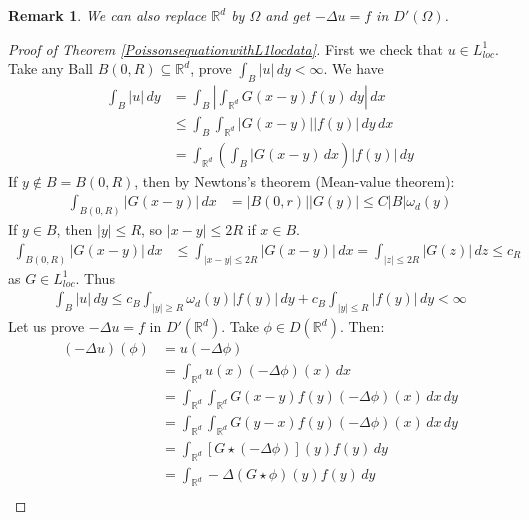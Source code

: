 \documentclass{report}
\theoremstyle{tommy}
\newtheorem{rem}[defn]{Remark}
\begin{document}
  \begin{rem}
    We can also replace \(\mathbb{R}^d\) by \(\Omega\) and get \(- \Delta u = f\) in \(D'(\Omega)\). 
  \end{rem}

  \begin{proof}[Proof of Theorem \ref{PoissonsequationwithL1locdata}]
    First we check that \(u \in L_{loc}^1\). Take any Ball \(B(0, R) \subseteq \mathbb{R}^d\), prove \(\int_B |u| \, dy < \infty\). We have 
    \begin{align*}
      \int_B |u| \, dy 
      &= \int_B \left| \int_{\mathbb{R}^d} G(x-y) f(y) \, dy \right| \, dx \\
      &\le \int_B \int_{\mathbb{R}^d} |G(x-y)||f(y)| \, dy \, dx \\
      &= \int_{\mathbb{R}^d} \left(\int_B |G(x-y) \, dx\right)|f(y)| \, dy
    \end{align*}
    If \(y \notin B = B(0,R)\), then by Newtons's theorem (Mean-value theorem):
    \begin{align*}
      \int_{B(0, R)} |G(x-y)| \, dx
      &= |B(0, r)| |G(y)|
      \le C|B| \omega_d(y)
    \end{align*}
    If \(y \in B\), then \(|y| \le R\), so \(|x-y| \le 2 R\) if \(x \in B\).
    \begin{align*}
      \int_{B(0,R)}|G(x-y)| \, dx
      &\le \int_{|x-y|\le 2 R} |G(x-y)| \, dx
      = \int_{|z| \le 2 R} |G(z)| \, dz 
      \le c_R
    \end{align*}
    as \(G \in L_{loc}^1\). Thus
    \begin{align*}
      \int_B |u| \, dy 
      \le c_B \int_{|y|\ge R} \omega_d (y) |f(y)|\, dy + c_B \int_{|y|\le R} |f(y)| \, dy < \infty
    \end{align*}
    Let us prove \(- \Delta u = f\) in \(D'(\mathbb{R}^d)\). Take \(\phi \in D(\mathbb{R}^d)\). Then:
    \begin{align*}
      (-\Delta u)(\phi)
      &= u(-\Delta \phi)\\
      &= \int_{\mathbb{R}^d} u(x) (-\Delta \phi)(x) \, dx \\
      &= \int_{\mathbb{R}^d}\int_{\mathbb{R}^d} G(x-y) f(y) (-\Delta \phi)(x) \, dx \, dy\\
      &= \int_{\mathbb{R}^d}\int_{\mathbb{R}^d} G(y-x) f(y) (-\Delta \phi)(x) \, dx \, dy \\
      &= \int_{\mathbb{R}^d} [G \star (-\Delta \phi)](y) f(y) \, dy \\
      &= \int_{\mathbb{R}^d} -\Delta(G\star \phi)(y) f(y) \, dy \\

\end{align*}
\end{proof}
\end{document}
